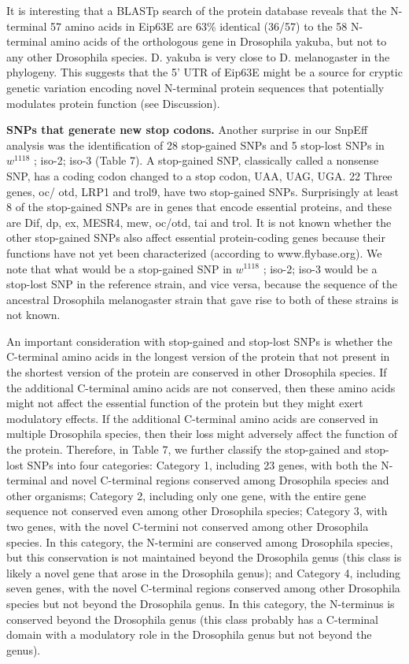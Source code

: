It is interesting that a BLASTp search of the protein database reveals that the N-terminal 57 amino acids in Eip63E are 63\% identical (36/57) to the 58 N-terminal amino acids of the orthologous gene in Drosophila yakuba, but not to any other Drosophila species. D. yakuba is very close to D. melanogaster in the phylogeny. This suggests that the 5' UTR of Eip63E might be a source for cryptic genetic variation encoding novel N-terminal protein sequences that potentially modulates protein function (see Discussion).

\textbf{SNPs that generate new stop codons.} Another surprise in our SnpEff analysis was the identification of 28 stop-gained SNPs and 5 stop-lost SNPs in $w^{1118}$ ; iso-2; iso-3 (Table 7). A stop-gained SNP, classically called a nonsense SNP, has a coding codon changed to a stop codon, UAA, UAG, UGA. 22 Three genes, oc/ otd, LRP1 and trol9, have two stop-gained SNPs. Surprisingly at least 8 of the stop-gained SNPs are in genes that encode essential proteins, and these are Dif, dp, ex, MESR4, mew, oc/otd, tai and trol. It is not known whether the other stop-gained SNPs also affect essential protein-coding genes because their functions have not yet been characterized (according to www.flybase.org). We note that what would be a stop-gained SNP in $w^{1118}$ ; iso-2; iso-3 would be a stop-lost SNP in the reference strain, and vice versa, because the sequence of the ancestral Drosophila melanogaster strain that gave rise to both of these strains is not known.

An important consideration with stop-gained and stop-lost SNPs is whether the C-terminal amino acids in the longest version of the protein that not present in the shortest version of the protein are conserved in other Drosophila species. If the additional C-terminal amino acids are not conserved, then these amino acids might not affect the essential function of the protein but they might exert modulatory effects. If the additional C-terminal amino acids are conserved in multiple Drosophila species, then their loss might adversely affect the function of the protein. Therefore, in Table 7, we further classify the stop-gained and stop-lost SNPs into four categories: Category 1, including 23 genes, with both the N-terminal and novel C-terminal regions conserved among Drosophila species and other organisms; Category 2, including only one gene, with the entire gene sequence not conserved even among other Drosophila species; Category 3, with two genes, with the novel C-termini not conserved among other Drosophila species. In this category, the N-termini are conserved among Drosophila species, but this conservation is not maintained beyond the Drosophila genus (this class is likely a novel gene that arose in the Drosophila genus); and Category 4, including seven genes, with the novel C-terminal regions conserved among other Drosophila species but not beyond the Drosophila genus. In this category, the N-terminus is conserved beyond the Drosophila genus (this class probably has a C-terminal domain with a modulatory role in the Drosophila genus but not beyond the genus).

